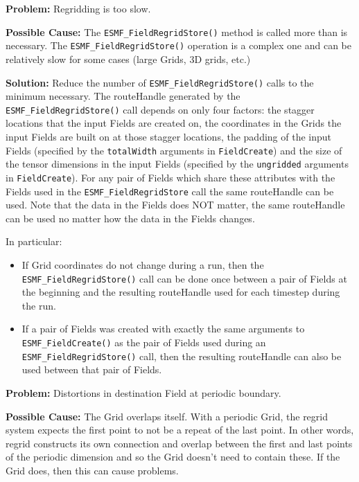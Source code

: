  \bigskip
 
 {\bf Problem:} Regridding is too slow.

 \medskip

 {\bf Possible Cause:} The {\tt ESMF\_FieldRegridStore()} method is called more than is necessary. \newline
 The {\tt ESMF\_FieldRegridStore()} operation is a complex one and can be 
 relatively slow for some cases (large Grids, 3D grids, etc.) 
 
 \smallskip

 {\bf Solution:} Reduce the number of {\tt ESMF\_FieldRegridStore()} calls to the minimum necessary. The
 routeHandle generated by the {\tt ESMF\_FieldRegridStore()} call depends on only four factors: the 
 stagger locations that the input Fields are created on, the coordinates in the Grids the input Fields
 are built on at those stagger locations, the padding of the input Fields 
 (specified by the {\tt totalWidth} arguments in {\tt FieldCreate}) and the size of the tensor
 dimensions in the input Fields (specified by the {\tt ungridded} arguments in {\tt FieldCreate}). 
 For any pair of Fields which share these attributes with the Fields used in the
 {\tt ESMF\_FieldRegridStore} call  the same routeHandle can be used. Note that the data in the 
 Fields does NOT matter, the same routeHandle can be used no matter how the data in the Fields changes.

 \smallskip

 In particular:
 \begin{itemize}

 \item If Grid coordinates do not change during a run, then the {\tt ESMF\_FieldRegridStore()} call can be
 done once between a pair of Fields at the beginning and the resulting routeHandle used for each 
 timestep during the run. 

 \item If a pair of Fields was created with exactly the same arguments to {\tt ESMF\_FieldCreate()} as the 
 pair of Fields used during an {\tt ESMF\_FieldRegridStore()} call, then the resulting routeHandle can 
 also be used between that pair of Fields. 
 \end{itemize}

 \bigskip
 
 {\bf Problem:} Distortions in destination Field at periodic boundary.

 \medskip

 {\bf Possible Cause:} The Grid overlaps itself. With a periodic Grid, the regrid system expects
  the first point to not be a repeat of the last point. In other words,
  regrid constructs its own connection and overlap between the first and last points of the
  periodic dimension and so the Grid doesn't need to contain these. If the Grid does, then this
  can cause problems. 

